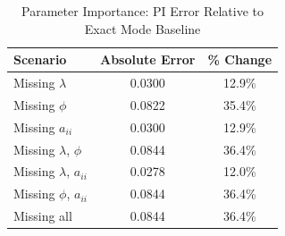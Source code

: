 
\begin{table}[H]
\centering
\caption{Parameter Importance: PI Error Relative to Exact Mode Baseline}
\label{tab:parameter_importance}
\begin{tabular}{lcc}
\hline
\textbf{Scenario} & \textbf{Absolute Error} & \textbf{\% Change} \\
\hline
Missing $\lambda$ & 0.0300 & 12.9\% \\
Missing $\phi$ & 0.0822 & 35.4\% \\
Missing $a_{ii}$ & 0.0300 & 12.9\% \\
Missing $\lambda$, $\phi$ & 0.0844 & 36.4\% \\
Missing $\lambda$, $a_{ii}$ & 0.0278 & 12.0\% \\
Missing $\phi$, $a_{ii}$ & 0.0844 & 36.4\% \\
Missing all & 0.0844 & 36.4\% \\
\hline
\end{tabular}
\end{table}
